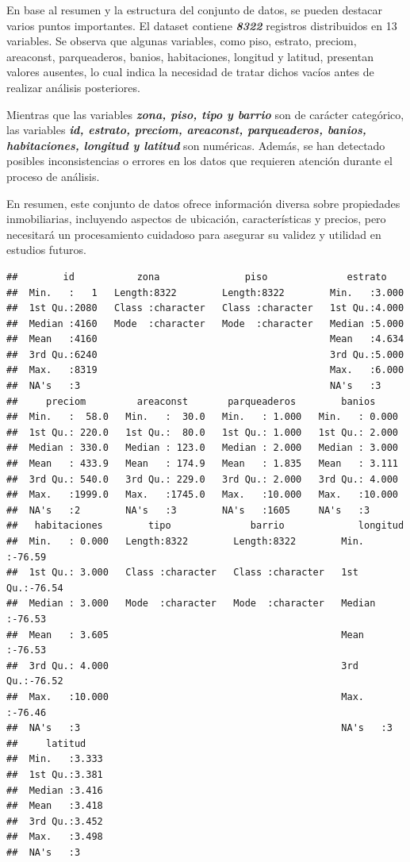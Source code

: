 \documentclass[
]{article}
\begin{document}
En base al resumen y la estructura del conjunto de datos, se pueden
destacar varios puntos importantes. El dataset contiene
\textbf{\emph{8322}} registros distribuidos en 13 variables. Se observa
que algunas variables, como piso, estrato, preciom, areaconst,
parqueaderos, banios, habitaciones, longitud y latitud, presentan
valores ausentes, lo cual indica la necesidad de tratar dichos vacíos
antes de realizar análisis posteriores.

Mientras que las variables \textbf{\emph{zona, piso, tipo y barrio}} son
de carácter categórico, las variables \textbf{\emph{id, estrato,
preciom, areaconst, parqueaderos, banios, habitaciones, longitud y
latitud}} son numéricas. Además, se han detectado posibles
inconsistencias o errores en los datos que requieren atención durante el
proceso de análisis.

En resumen, este conjunto de datos ofrece información diversa sobre
propiedades inmobiliarias, incluyendo aspectos de ubicación,
características y precios, pero necesitará un procesamiento cuidadoso
para asegurar su validez y utilidad en estudios futuros.

\begin{verbatim}
##        id           zona               piso              estrato     
##  Min.   :   1   Length:8322        Length:8322        Min.   :3.000  
##  1st Qu.:2080   Class :character   Class :character   1st Qu.:4.000  
##  Median :4160   Mode  :character   Mode  :character   Median :5.000  
##  Mean   :4160                                         Mean   :4.634  
##  3rd Qu.:6240                                         3rd Qu.:5.000  
##  Max.   :8319                                         Max.   :6.000  
##  NA's   :3                                            NA's   :3      
##     preciom         areaconst       parqueaderos        banios      
##  Min.   :  58.0   Min.   :  30.0   Min.   : 1.000   Min.   : 0.000  
##  1st Qu.: 220.0   1st Qu.:  80.0   1st Qu.: 1.000   1st Qu.: 2.000  
##  Median : 330.0   Median : 123.0   Median : 2.000   Median : 3.000  
##  Mean   : 433.9   Mean   : 174.9   Mean   : 1.835   Mean   : 3.111  
##  3rd Qu.: 540.0   3rd Qu.: 229.0   3rd Qu.: 2.000   3rd Qu.: 4.000  
##  Max.   :1999.0   Max.   :1745.0   Max.   :10.000   Max.   :10.000  
##  NA's   :2        NA's   :3        NA's   :1605     NA's   :3       
##   habitaciones        tipo              barrio             longitud     
##  Min.   : 0.000   Length:8322        Length:8322        Min.   :-76.59  
##  1st Qu.: 3.000   Class :character   Class :character   1st Qu.:-76.54  
##  Median : 3.000   Mode  :character   Mode  :character   Median :-76.53  
##  Mean   : 3.605                                         Mean   :-76.53  
##  3rd Qu.: 4.000                                         3rd Qu.:-76.52  
##  Max.   :10.000                                         Max.   :-76.46  
##  NA's   :3                                              NA's   :3       
##     latitud     
##  Min.   :3.333  
##  1st Qu.:3.381  
##  Median :3.416  
##  Mean   :3.418  
##  3rd Qu.:3.452  
##  Max.   :3.498  
##  NA's   :3
\end{verbatim}
\end{document}
